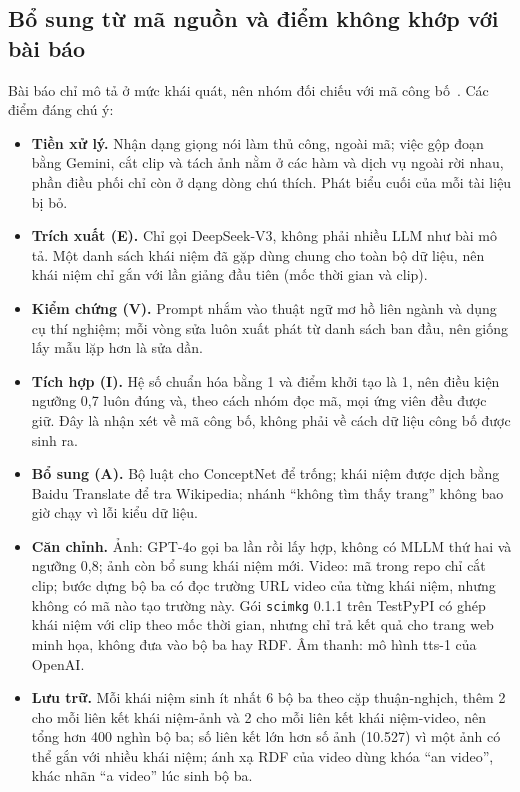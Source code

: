 \subsection{Bổ sung từ mã nguồn và điểm không khớp với bài báo}\label{sec:sm-mismatch}
Bài báo chỉ mô tả ở mức khái quát, nên nhóm đối chiếu với mã công bố~\cite{kgbnu2026scimkgcode}.
Các điểm đáng chú ý:
\begin{itemize}
\item \textbf{Tiền xử lý.} Nhận dạng giọng nói làm thủ công, ngoài mã; việc gộp đoạn bằng Gemini, cắt clip và tách ảnh nằm ở các hàm và dịch vụ ngoài rời nhau, phần điều phối chỉ còn ở dạng dòng chú thích. Phát biểu cuối của mỗi tài liệu bị bỏ.
\item \textbf{Trích xuất (E).} Chỉ gọi DeepSeek-V3, không phải nhiều LLM như bài mô tả. Một danh sách khái niệm đã gặp dùng chung cho toàn bộ dữ liệu, nên khái niệm chỉ gắn với lần giảng đầu tiên (mốc thời gian và clip).
\item \textbf{Kiểm chứng (V).} Prompt nhắm vào thuật ngữ mơ hồ liên ngành và dụng cụ thí nghiệm; mỗi vòng sửa luôn xuất phát từ danh sách ban đầu, nên giống lấy mẫu lặp hơn là sửa dần.
\item \textbf{Tích hợp (I).} Hệ số chuẩn hóa bằng 1 và điểm khởi tạo là 1, nên điều kiện ngưỡng 0,7 luôn đúng và, theo cách nhóm đọc mã, mọi ứng viên đều được giữ. Đây là nhận xét về mã công bố, không phải về cách dữ liệu công bố được sinh ra.
\item \textbf{Bổ sung (A).} Bộ luật cho ConceptNet để trống; khái niệm được dịch bằng Baidu Translate để tra Wikipedia; nhánh ``không tìm thấy trang'' không bao giờ chạy vì lỗi kiểu dữ liệu.
\item \textbf{Căn chỉnh.} Ảnh: GPT-4o gọi ba lần rồi lấy hợp, không có MLLM thứ hai và ngưỡng 0,8; ảnh còn bổ sung khái niệm mới. Video: mã trong repo chỉ cắt clip; bước dựng bộ ba có đọc trường URL video của từng khái niệm, nhưng không có mã nào tạo trường này. Gói \texttt{scimkg} 0.1.1 trên TestPyPI có ghép khái niệm với clip theo mốc thời gian, nhưng chỉ trả kết quả cho trang web minh họa, không đưa vào bộ ba hay RDF. Âm thanh: mô hình tts-1 của OpenAI.
\item \textbf{Lưu trữ.} Mỗi khái niệm sinh ít nhất 6 bộ ba theo cặp thuận-nghịch, thêm 2 cho mỗi liên kết khái niệm-ảnh và 2 cho mỗi liên kết khái niệm-video, nên tổng hơn 400 nghìn bộ ba; số liên kết lớn hơn số ảnh (10.527) vì một ảnh có thể gắn với nhiều khái niệm; ánh xạ RDF của video dùng khóa ``an video'', khác nhãn ``a video'' lúc sinh bộ ba.
\end{itemize}

